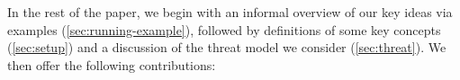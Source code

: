 \documentclass[acmsmall,review,anonymous]{acmart}\settopmatter{printfolios=true,printccs=false,printacmref=false}
\begin{document}

In the rest of the paper, we begin with an informal overview of our key ideas via
examples (\cref{sec:running-example}), followed by definitions of some key
concepts (\cref{sec:setup}) and a discussion of the threat
model we consider (\cref{sec:threat}). We then offer the following contributions:
\end{document}
